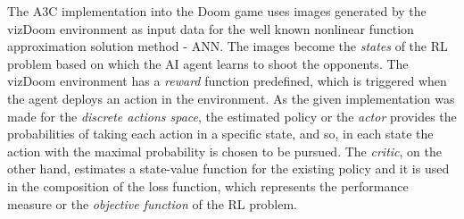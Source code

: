 The A3C implementation into the Doom game uses images generated by the vizDoom environment as input data for the well known nonlinear function approximation solution method - ANN. The images become the \textit{states} of the RL problem based on which the AI agent learns to shoot the opponents. The vizDoom environment has a \textit{reward} function predefined, which is triggered when the agent deploys an action in the environment. As the given implementation was made for the \textit{discrete actions space}, the estimated policy or the \textit{actor} provides the probabilities of taking each action in a specific state, and so, in each state the action with the maximal probability is chosen to be pursued. The \textit{critic}, on the other hand, estimates a state-value function for the existing policy and it is used in the composition of the loss function, which represents the performance measure or the \textit{objective function} of the RL problem.

